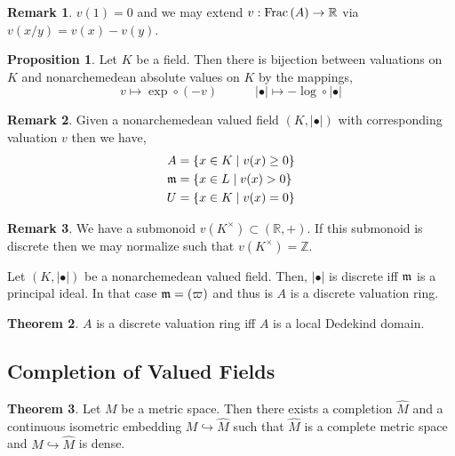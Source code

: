 \documentclass[12pt]{extarticle}
\newcommand{\Z}{\mathbb{Z}}
\newcommand{\R}{\mathbb{R}}
\theoremstyle{definition}
\newtheorem{theorem}{Theorem}[section]
\newtheorem{proposition}[theorem]{Proposition}
\newtheorem{remark}{Remark}
\newenvironment{definition}[1][Definition:]{\begin{trivlist}
\item[\hskip \labelsep {\bfseries #1}]}{\end{trivlist}}
\begin{document}
\begin{remark}
$v(1) = 0$ and we may extend $v : \Frac{A} \to \R$ via $v(x/y) = v(x) - v(y)$. 
\end{remark}

\begin{proposition}
Let $K$ be a field. Then there is bijection between valuations on $K$ and nonarchemedean absolute values on $K$ by the mappings,
\[ v \mapsto \exp \circ (-v) \quad \quad \quad |\bullet| \mapsto - \log \circ | \bullet | \]
\end{proposition}

\begin{remark}
Given a nonarchemedean valued field $(K, | \bullet |)$ with corresponding valuation $v$ then we have,
\begin{align*}
A & = \{ x \in K \mid v(x) \ge 0 \}
\\
\mathfrak{m} & = \{ x \in L \mid v(x)  > 0 \}
\\
U & = \{ x \in K \mid v(x) = 0 \}
\end{align*}
\end{remark}

\begin{remark}
We have a submonoid $v(K^\times) \subset (\R, +)$. If this submonoid is discrete then we may normalize such that $v(K^\times) = \Z$. 
\end{remark}

\begin{definition}
Let $(K, |\bullet|)$ be a nonarchemedean valued field. Then, $| \bullet |$ is discrete iff $\mathfrak{m}$ is a principal ideal. In that case $\mathfrak{m} = (\varpi)$ and thus is $A$ is a discrete valuation ring.
\end{definition}

\begin{theorem}
$A$ is a discrete valuation ring iff $A$ is a local Dedekind domain. 
\end{theorem}

\newcommand{\Q}{\mathbb{Q}}

\subsection{Completion of Valued Fields}

\begin{theorem}
Let $M$ be a metric space. Then there exists a completion $\hat{M}$ and a continuous isometric embedding $M \hookrightarrow \hat{M}$ such that $\hat{M}$ is a complete metric space and $M \hookrightarrow \hat{M}$ is dense.  
\end{theorem}
\end{document}
